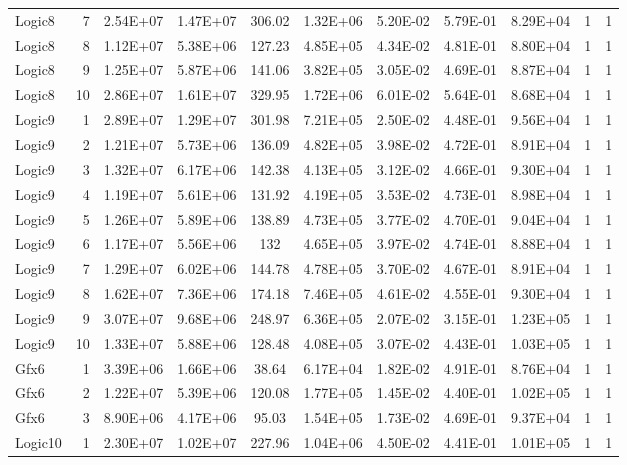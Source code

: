 \begin{longtable}{@{}l!{\vrule}r!{\vrule}c!{\vrule}c!{\vrule}c!{\vrule}c!{\vrule}c!{\vrule}c!{\vrule}c!{\vrule}c!{\vrule}c@{}}
Logic8 & 7 & 2.54E+07 & 1.47E+07 & 306.02 & 1.32E+06 & 5.20E-02 & 5.79E-01 & 8.29E+04 & 1 & 1 \\
Logic8 & 8 & 1.12E+07 & 5.38E+06 & 127.23 & 4.85E+05 & 4.34E-02 & 4.81E-01 & 8.80E+04 & 1 & 1 \\
Logic8 & 9 & 1.25E+07 & 5.87E+06 & 141.06 & 3.82E+05 & 3.05E-02 & 4.69E-01 & 8.87E+04 & 1 & 1 \\
Logic8 & 10 & 2.86E+07 & 1.61E+07 & 329.95 & 1.72E+06 & 6.01E-02 & 5.64E-01 & 8.68E+04 & 1 & 1 \\
\hline
Logic9 & 1 & 2.89E+07 & 1.29E+07 & 301.98 & 7.21E+05 & 2.50E-02 & 4.48E-01 & 9.56E+04 & 1 & 1 \\
Logic9 & 2 & 1.21E+07 & 5.73E+06 & 136.09 & 4.82E+05 & 3.98E-02 & 4.72E-01 & 8.91E+04 & 1 & 1 \\
Logic9 & 3 & 1.32E+07 & 6.17E+06 & 142.38 & 4.13E+05 & 3.12E-02 & 4.66E-01 & 9.30E+04 & 1 & 1 \\
Logic9 & 4 & 1.19E+07 & 5.61E+06 & 131.92 & 4.19E+05 & 3.53E-02 & 4.73E-01 & 8.98E+04 & 1 & 1 \\
Logic9 & 5 & 1.26E+07 & 5.89E+06 & 138.89 & 4.73E+05 & 3.77E-02 & 4.70E-01 & 9.04E+04 & 1 & 1 \\
Logic9 & 6 & 1.17E+07 & 5.56E+06 & 132 & 4.65E+05 & 3.97E-02 & 4.74E-01 & 8.88E+04 & 1 & 1 \\
Logic9 & 7 & 1.29E+07 & 6.02E+06 & 144.78 & 4.78E+05 & 3.70E-02 & 4.67E-01 & 8.91E+04 & 1 & 1 \\
Logic9 & 8 & 1.62E+07 & 7.36E+06 & 174.18 & 7.46E+05 & 4.61E-02 & 4.55E-01 & 9.30E+04 & 1 & 1 \\
Logic9 & 9 & 3.07E+07 & 9.68E+06 & 248.97 & 6.36E+05 & 2.07E-02 & 3.15E-01 & 1.23E+05 & 1 & 1 \\
Logic9 & 10 & 1.33E+07 & 5.88E+06 & 128.48 & 4.08E+05 & 3.07E-02 & 4.43E-01 & 1.03E+05 & 1 & 1 \\
\hline
{}
Gfx6 & 1 & 3.39E+06 & 1.66E+06 & 38.64 & 6.17E+04 & 1.82E-02 & 4.91E-01 & 8.76E+04 & 1 & 1 \\
Gfx6 & 2 & 1.22E+07 & 5.39E+06 & 120.08 & 1.77E+05 & 1.45E-02 & 4.40E-01 & 1.02E+05 & 1 & 1 \\
Gfx6 & 3 & 8.90E+06 & 4.17E+06 & 95.03 & 1.54E+05 & 1.73E-02 & 4.69E-01 & 9.37E+04 & 1 & 1 \\
\hline
Logic10 & 1 & 2.30E+07 & 1.02E+07 & 227.96 & 1.04E+06 & 4.50E-02 & 4.41E-01 & 1.01E+05 & 1 & 1 \\

\end{longtable}

